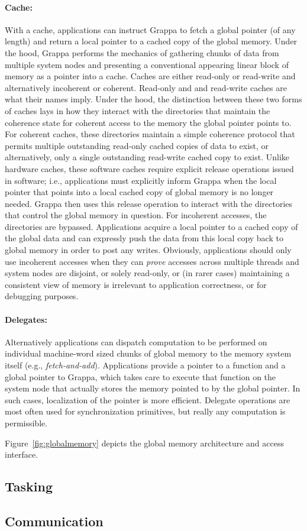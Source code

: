 \paragraph{Cache:} With a cache, applications can instruct Grappa to fetch a global pointer (of any length) and return a local pointer to a cached copy of the global memory.  Under the hood, Grappa performs the mechanics of gathering chunks of data from multiple system nodes and presenting a conventional appearing linear block of memory as a pointer into a cache.  Caches are either read-only or read-write and alternatively incoherent or coherent.  Read-only and and read-write caches are what their names imply.  Under the hood, the distinction between these two forms of caches lays in how they interact with the directories that maintain the coherence state for coherent access to the memory the global pointer points to.  For coherent caches, these directories maintain a simple coherence protocol that permits multiple outstanding read-only cached copies of data to exist, or alternatively, only a single outstanding read-write cached copy to exist.  Unlike hardware caches, these software caches require explicit release operations issued in software; i.e., applications must explicitly inform Grappa when the local pointer that points into a local cached copy of global memory is no longer needed.  Grappa then uses this release operation to interact with the directories that control the global memory in question.  For incoherent accesses, the directories are bypassed.  Applications acquire a local pointer to a cached copy of the global data and can expressly push the data from this local copy back to global memory in order to post any writes.  Obviously, applications should only use incoherent accesses when they can \emph{prove} accesses across multiple threads and system nodes are disjoint, or solely read-only, or (in rarer cases) maintaining a consistent view of memory is irrelevant to application correctness, or for debugging purposes.

\paragraph{Delegates:} Alternatively applications can dispatch computation to be performed on individual machine-word sized chunks of global memory to the memory system itself (e.g., \emph{fetch-and-add}).  Applications provide a pointer to a function and a global pointer to Grappa, which takes care to execute that function on the system node that actually stores the memory pointed to by the global pointer.  In such cases, localization of the pointer is more efficient.  Delegate operations are most often used for synchronization primitives, but really any computation is permissible.


Figure~\ref{fig:globalmemory} depicts the global memory architecture and access interface.

\subsection{Tasking}

\subsection{Communication}
